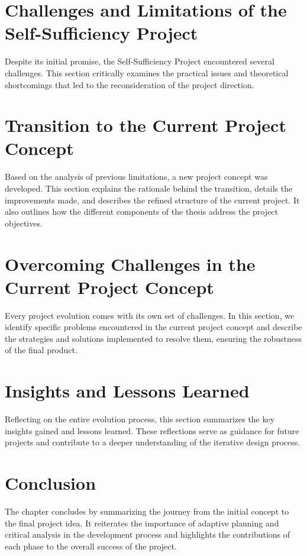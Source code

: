 \section{Challenges and Limitations of the Self-Sufficiency Project}
Despite its initial promise, the Self-Sufficiency Project encountered several challenges. This section critically examines the practical issues and theoretical shortcomings that led to the reconsideration of the project direction.

\section{Transition to the Current Project Concept}
Based on the analysis of previous limitations, a new project concept was developed. This section explains the rationale behind the transition, details the improvements made, and describes the refined structure of the current project. It also outlines how the different components of the thesis address the project objectives.

\section{Overcoming Challenges in the Current Project Concept}
Every project evolution comes with its own set of challenges. In this section, we identify specific problems encountered in the current project concept and describe the strategies and solutions implemented to resolve them, ensuring the robustness of the final product.

\section{Insights and Lessons Learned}
Reflecting on the entire evolution process, this section summarizes the key insights gained and lessons learned. These reflections serve as guidance for future projects and contribute to a deeper understanding of the iterative design process.

\section{Conclusion}
The chapter concludes by summarizing the journey from the initial concept to the final project idea. It reiterates the importance of adaptive planning and critical analysis in the development process and highlights the contributions of each phase to the overall success of the project.

